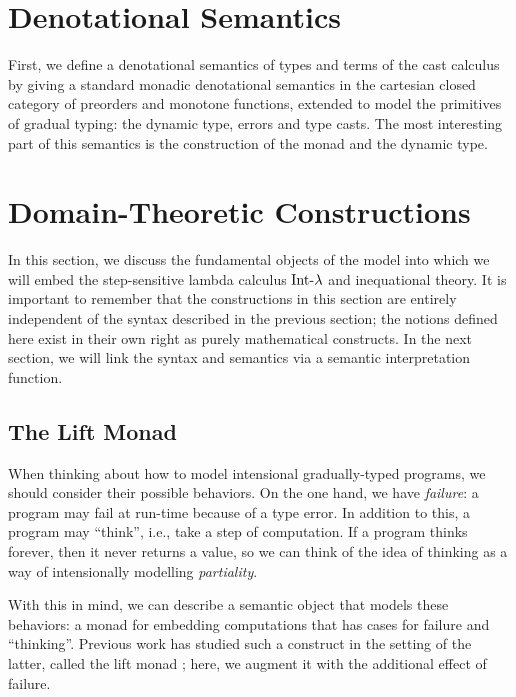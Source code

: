 \section{Denotational Semantics}

First, we define a denotational semantics of types and terms of the
cast calculus by giving a standard monadic denotational semantics in
the cartesian closed category of preorders and monotone functions,
extended to model the primitives of gradual typing: the dynamic type,
errors and type casts. The most interesting part of this semantics is
the construction of the monad and the dynamic type.



\section{Domain-Theoretic Constructions}\label{sec:domain-theory}

In this section, we discuss the fundamental objects of the model into which we will embed
the step-sensitive lambda calculus $\text{Int-}\lambda$ and inequational theory. It is important to remember that
the constructions in this section are entirely independent of the syntax described in the
previous section; the notions defined here exist in their own right as purely mathematical
constructs. In the next section, we will link the syntax and semantics via a semantic interpretation
function.

\subsection{The Lift Monad}

When thinking about how to model intensional gradually-typed programs, we should consider
their possible behaviors. On the one hand, we have \emph{failure}: a program may fail
at run-time because of a type error. In addition to this, a program may ``think'',
i.e., take a step of computation. If a program thinks forever, then it never returns a value,
so we can think of the idea of thinking as a way of intensionally modelling \emph{partiality}.

With this in mind, we can describe a semantic object that models these behaviors: a monad
for embedding computations that has cases for failure and ``thinking''.
Previous work has studied such a construct in the setting of the latter, called the lift
monad \cite{mogelberg-paviotti2016}; here, we augment it with the additional effect of failure.

